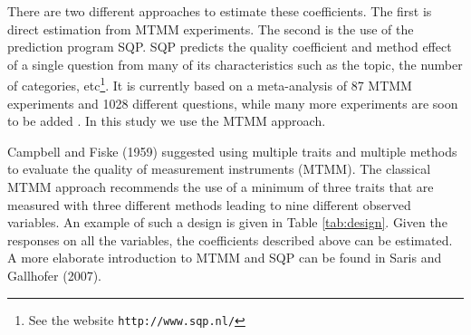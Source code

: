 \documentclass[a4paper,12pt]{article}
\begin{document}
There are two different approaches to estimate these coefficients. The first is direct estimation from MTMM experiments. The second is the use of the prediction program SQP. SQP predicts the quality coefficient and method effect of a single question from many of its characteristics such as the topic, the number of categories, etc\footnote{See the website \texttt{http://www.sqp.nl/}}. It is currently based on a meta-analysis of 87 MTMM experiments and 1028 different questions, while many more experiments are soon to be added \citep{oberski_sqp_}. In this study we use the MTMM approach.

Campbell and Fiske (1959) suggested using multiple traits and multiple methods to evaluate the quality of measurement instruments (MTMM). The classical MTMM approach recommends the use of a minimum of three traits that are measured with three different methods leading to nine different observed variables. An example of such a design is given in Table \ref{tab:design}. Given the responses on all the variables, the coefficients described above can be estimated. A more elaborate introduction to MTMM and SQP can be found in Saris and Gallhofer (2007).

\begin{table}[htb]\caption{The classic MTMM design used in the ESS pilot study.\label{tab:design}}
\end{table}
\end{document}
